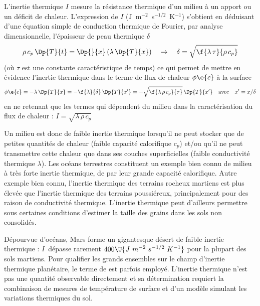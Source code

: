 L'inertie thermique $I$ mesure la résistance
thermique d'un milieu à un apport ou un
déficit de chaleur.
%
L'expression de $I$ (J~m$^{-2}$~s$^{-1/2}$~K$^{-1}$) 
s'obtient en déduisant d'une équation
simple de conduction thermique de Fourier,
par analyse dimensionnelle, l'épaisseur
de peau thermique $\delta$ 
%
\[
\rho \, c_p \, \Dp{T}{t} = \Dp{}{x} \left( \lambda \, \Dp{T}{x} \right)
\quad
\to
\quad
\delta = \sqrt{\f{\lambda \, \tau}{\rho \, c_p}}
\]
%
\noindent (où $\tau$ est une constante caractéristique de temps)
ce qui permet de mettre en évidence l'inertie
thermique dans le terme de flux de chaleur $\phi\e{c}$
à la surface
%
\[
\phi\e{c} = - \lambda \, \Dp{T}{x} = - \f{\lambda}{\delta} \, \Dp{T}{x'} 
= - \sqrt{\f{\lambda \, \rho \, c_p}{\tau}} \, \Dp{T}{x'}
\quad 
\textrm{avec}
\quad
x'=x/\delta 
\]
\noindent en ne retenant que les termes qui dépendent du milieu
dans la caractérisation du flux de chaleur :
%
$\boxed{
I = \sqrt{\lambda \, \rho \, c_p}
}$


Un milieu est donc de faible inertie thermique
lorsqu'il ne peut stocker que de petites quantités de chaleur
(faible capacité calorifique $c_p$)
et/ou qu'il ne peut transmettre cette chaleur que dans ses couches superficielles
(faible conductivité thermique $\lambda$).
%
Les océans terrestres constituent un exemple 
bien connu de milieu à très forte inertie thermique, 
de par leur grande capacité calorifique.
%
Autre exemple bien connu, 
l'inertie thermique des terrains rocheux
martiens est plus élevée que 
l'inertie thermique des terrains
poussiéreux, principalement
pour des raison de conductivité thermique.
%
L'inertie thermique
peut d'ailleurs permettre 
sous certaines conditions d'estimer
la taille des grains dans les sols
non consolidés.

Dépourvue d'océans, Mars forme
un gigantesque désert de faible inertie
thermique : $I$~dépasse 
rarement $400\U{J~m^{-2}~s^{-1/2}~K^{-1}}$
pour la plupart des sols martiens.
%
Pour qualifier les grands
ensembles sur le champ d'inertie
thermique planétaire,
le terme de 
est parfois employé.
%
L'inertie thermique n'est pas une
quantité observable directement
et sa détermination requiert la combinaison
de mesures de température de surface et
d'un modèle simulant les variations thermiques du sol.
